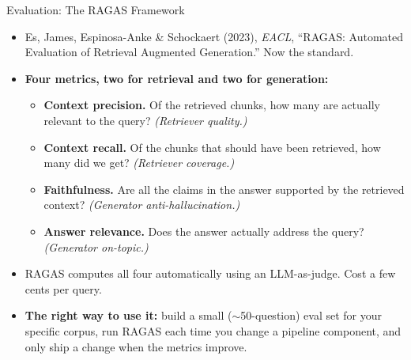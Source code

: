 \begin{frame}{Evaluation: The RAGAS Framework}
\begin{itemize}
\item Es, James, Espinosa-Anke \& Schockaert (2023), \emph{EACL}, ``RAGAS: Automated Evaluation of Retrieval Augmented Generation.'' Now the standard.

\medskip
\item \textbf{Four metrics, two for retrieval and two for generation:}
\begin{itemize}
    \item \textbf{Context precision.} Of the retrieved chunks, how many are actually relevant to the query? \emph{(Retriever quality.)}
    \medskip
    \item \textbf{Context recall.} Of the chunks that should have been retrieved, how many did we get? \emph{(Retriever coverage.)}
    \medskip
    \item \textbf{Faithfulness.} Are all the claims in the answer supported by the retrieved context? \emph{(Generator anti-hallucination.)}
    \medskip
    \item \textbf{Answer relevance.} Does the answer actually address the query? \emph{(Generator on-topic.)}
\end{itemize}

\medskip
\item RAGAS computes all four automatically using an LLM-as-judge. Cost a few cents per query.

\medskip
\item \textbf{The right way to use it:} build a small ($\sim$50-question) eval set for your specific corpus, run RAGAS each time you change a pipeline component, and only ship a change when the metrics improve.
\end{itemize}
\end{frame}

